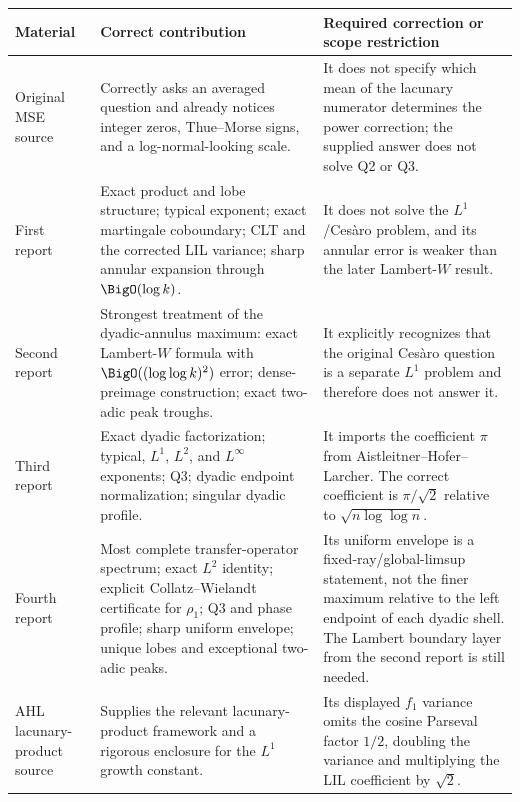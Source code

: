 \documentclass[11pt,oneside]{article}
\theoremstyle{definition}
\theoremstyle{remark}
\begin{document}
\begin{center}
\small
\begin{tabularx}{\textwidth}{@{}>{\raggedright\arraybackslash}p{}
 >{\raggedright\arraybackslash}p{}>{\raggedright\arraybackslash}X@{}}
\toprule
Material & Correct contribution & Required correction or scope restriction\\
\midrule
Original MSE source~\cite{mse-source}
& Correctly asks an averaged question and already notices integer zeros,
Thue--Morse signs, and a log-normal-looking scale.
& It does not specify which mean of the lacunary numerator determines the
power correction; the supplied answer does not solve Q2 or Q3.\\[0.7em]

First report~\cite{wave1a}
& Exact product and lobe structure; typical exponent; exact martingale
coboundary; CLT and the corrected LIL variance; sharp annular expansion through
$\BigO(\log k)$.
& It does not solve the $L^1$/Ces\`aro problem, and its annular error is weaker
than the later Lambert-$W$ result.\\[0.7em]

Second report~\cite{wave1b}
& Strongest treatment of the dyadic-annulus maximum: exact Lambert-$W$
formula with $\BigO((\log\log k)^2)$ error; dense-preimage construction; exact
two-adic peak troughs.
& It explicitly recognizes that the original Ces\`aro question is a separate
$L^1$ problem and therefore does not answer it.\\[0.7em]

Third report~\cite{wave1c}
& Exact dyadic factorization; typical, $L^1$, $L^2$, and $L^\infty$ exponents;
Q3; dyadic endpoint normalization; singular dyadic profile.
& It imports the coefficient $\pi$ from Aistleitner--Hofer--Larcher.  The
correct coefficient is $\pi/\sqrt2$ relative to
$\sqrt{n\log\log n}$.\\[0.7em]

Fourth report~\cite{wave1d}
& Most complete transfer-operator spectrum; exact $L^2$ identity; explicit
Collatz--Wielandt certificate for $\rho_1$; Q3 and phase profile; sharp uniform
envelope; unique lobes and exceptional two-adic peaks.
& Its uniform envelope is a fixed-ray/global-limsup statement, not the finer
maximum relative to the left endpoint of each dyadic shell.  The Lambert
boundary layer from the second report is still needed.\\[0.7em]

AHL lacunary-product source~\cite{ahl2017}
& Supplies the relevant lacunary-product framework and a rigorous enclosure
for the $L^1$ growth constant.
& Its displayed $f_1$ variance omits the cosine Parseval factor $1/2$, doubling
the variance and multiplying the LIL coefficient by $\sqrt2$.\\[0.7em]


\end{tabularx}
\end{center}
\end{document}
